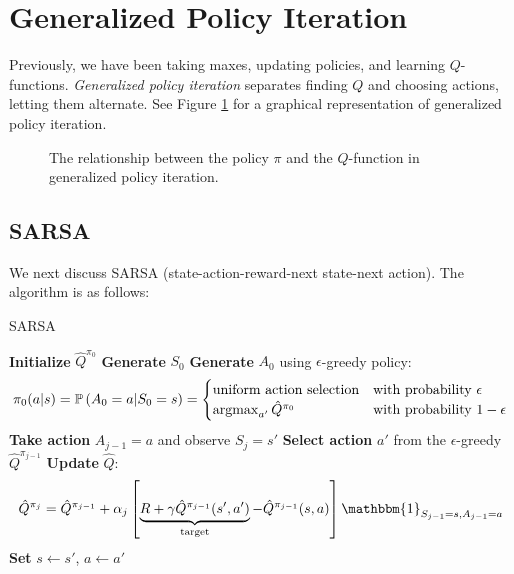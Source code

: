 \documentclass[11pt]{article}
\begin{document}
\section{Generalized Policy Iteration}

Previously, we have been taking maxes, updating policies, and learning $Q$-functions. \textit{Generalized policy iteration} separates finding $Q$ and choosing actions, letting them alternate. See Figure \ref{fig:gpi} for a graphical representation of generalized policy iteration. 

\begin{figure}[htbp]
    \centering
    \caption{The relationship between the policy $\pi$ and the $Q$-function in generalized policy iteration.}
    \label{fig:gpi}
\end{figure}

\subsection{SARSA}

We next discuss SARSA (state-action-reward-next state-next action). The algorithm is as follows:

\begin{algorithm}
    \caption*{\textsc{SARSA}}
	\begin{algorithmic}[1]
    	\STATE \textbf{Initialize} $\hat{Q}^{\pi_0}$
    	\STATE \textbf{Generate} $S_0$
    	\STATE \textbf{Generate} $A_0$ using $\epsilon$-greedy policy: 
    	    $$\pi_0(a|s) = \mathbb{P}\left( A_0=a|S_0=s \right) = 
    	    \begin{cases}
            \text{uniform action selection} & \text{with probability } \epsilon \\ 
            \operatorname*{argmax}_{a'} \hat{Q}^{\pi_0} & \text{with probability } 1 - \epsilon \\ 
            \end{cases}$$
    	    \STATE \textbf{Take action} $A_{j-1}=a$ and observe $S_j=s'$
    	    \STATE \textbf{Select action} $a'$ from the $\epsilon$-greedy $\hat{Q}^{\pi_{j - 1}}$ 
    	    \STATE \textbf{Update} $\hat{Q}$: $$\hat{Q}^{\pi_{j}} = \hat{Q}^{\pi_{j - 1}} + \alpha_j\left[\underbrace{R + \gamma \hat{Q}^{\pi_{j - 1}}(s', a')}_{\text{target}} - \hat{Q}^{\pi_{j - 1}}(s, a)\right]\mathbbm{1}_{S_{j-1}=s, A_{j-1}=a}$$
    	    \STATE \textbf{Set} $s \leftarrow s'$, $a \leftarrow a'$ 
    	\ENDFOR
    \end{algorithmic}
\end{algorithm}
\end{document}
